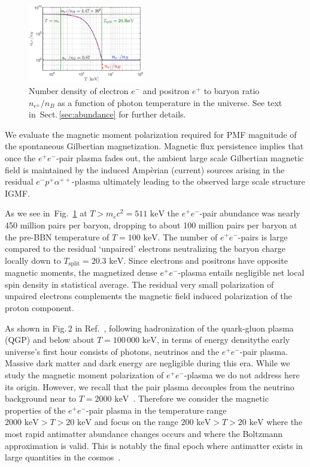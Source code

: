 \documentclass[aps,prd,floatfix,reprint]{revtex4-2}
\newcommand*{\keV}{\text{ keV}}
\newcommand{\rf}[1]{Fig.~{\ref{#1}}}
\newcommand{\rsec}[1]{Sect.\,{\ref{#1}}}
\begin{document}
\begin{figure}[ht]
 \centering
\includegraphics[width=0.45\textwidth]{plots/EEPlasmaDensityRatio_new01.jpg}
 \caption{Number density of electron $e^{-}$ and positron $e^{+}$ to baryon ratio $n_{e^{\pm}}/n_{B}$ as a function of photon temperature in the universe. See text in~\rsec{sec:abundance} for further details.}
 \label{fig:densityratio} 
\end{figure}

We evaluate the magnetic moment polarization required for PMF magnitude of the spontaneous Gilbertian magnetization. Magnetic flux persistence implies that once the $e^{+}e^{-}$-pair plasma fades out, the ambient large scale Gilbertian magnetic field is maintained by the induced Amp{\`e}rian (current) sources arising in the residual $e^{-}p^{+}\alpha^{++}$-plasma ultimately leading to the observed large scale structure IGMF. 

As we see in~\rf{fig:densityratio} at $T>m_ec^2=511\keV$ the $e^{+}e^{-}$-pair abundance was nearly 450 million pairs per baryon, dropping to about 100 million pairs per baryon at the pre-BBN temperature of $T=100\keV$. The number of $e^{+}e^{-}$-pairs is large compared to the residual `unpaired' electrons neutralizing the baryon charge locally down to $T_\mathrm{split}=20.3\keV$. Since electrons and positrons have opposite magnetic moments, the magnetized dense $e^{+}e^{-}$-plasma entails negligible net local spin density in statistical average. The residual very small polarization of unpaired electrons complements the magnetic field induced polarization of the proton component. 

As shown in Fig.\,2 in Ref.~\cite{Rafelski:2023emw}, following hadronization of the quark-gluon plasma (QGP) and below about $T\!=\!100\,000\keV$, in terms of energy densitythe early universe's first hour consists of photons, neutrinos and the $e^{+}e^{-}$-pair plasma. Massive dark matter and dark energy are negligible during this era. While we study the magnetic moment polarization of $e^{+}e^{-}$-plasma we do not address here its origin. However, we recall that the pair plasma decouples from the neutrino background near to $T=2000\keV$~\cite{Birrell:2014uka}. Therefore we consider the magnetic properties of the $e^{+}e^{-}$-pair plasma in the temperature range $2000\keV>T>20\keV$ and focus on the range $200\keV>T>20\keV$ where the most rapid antimatter abundance changes occurs and where the Boltzmann approximation is valid. This is notably the final epoch where antimatter exists in large quantities in the cosmos~\cite{Rafelski:2023emw}. 
\end{document}
